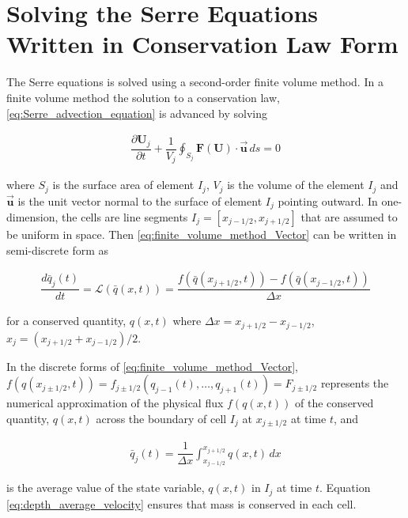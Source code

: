 \documentclass[SingleSpace,12pt]{Serre_ASCE}
\begin{document}
\section{Solving the Serre Equations Written in Conservation Law Form}
\label{section:Solving the Serre Equations Written in Conservation Law Form}

The Serre equations is solved using a second-order finite volume method. In a finite volume method the solution to a conservation law, \eqref{eq:Serre_advection_equation} is advanced by solving
\begin{linenomath*}
\begin{gather}
\dfrac{\partial \mathbf{U}_j}{\partial t} + \dfrac{1}{V_j} \oint_{S_j} \mathbf{F}(\mathbf{U}) \cdot \vec{\mathbf{u}} \, ds = 0
\label{eq:finite_volume_method_Vector}
\end{gather}
\end{linenomath*}
where $S_j$ is the surface area of element $I_j$, $V_j$ is the volume of the element $I_j$ and $\vec{\mathbf{u}}$ is the unit vector normal to the surface of element $I_j$ pointing outward. In one-dimension, the cells are line segments $I_j = [x_{j-1/2},x_{j+1/2}]$ that are assumed to be uniform in space. Then \eqref{eq:finite_volume_method_Vector} can be written in semi-discrete form as
\begin{linenomath*}
\begin{gather}\label{eq:semi-discrete}
\dfrac{d\bar{q}_j(t)}{dt} = \mathcal{L}(\bar{q}(x,t)) = \dfrac{f(\bar{q}(x_{j+1/2},t)) - f(\bar{q}(x_{j-1/2},t))}{\Delta x}
\end{gather}
\end{linenomath*}
for a conserved quantity, $q(x,t)$ where $\Delta x = x_{j+1/2} - x_{j-1/2}$, $x_j = (x_{j+1/2} + x_{j-1/2})/2$.

In the discrete forms of \eqref{eq:finite_volume_method_Vector}, $f(q(x_{j \pm 1/2},t)) = f_{j \pm 1/2}(q_{j-1}(t), \dots, q_{j+1}(t)) = F_{j \pm 1/2}$ represents the numerical approximation of the physical flux $f(q(x,t))$ of the conserved quantity, $q(x,t)$ across the boundary of cell $I_j$ at $x_{j \pm 1/2}$ at time $t$, and
\begin{linenomath*}
\begin{gather}\label{eq:depth_average_velocity}
\bar{q}_j(t) = \dfrac{1}{\Delta x} \int_{x_{j-1/2}}^{x_{j+1/2}} q(x,t) \, dx
\end{gather}
\end{linenomath*}
is the average value of the state variable, $q(x,t)$ in $I_j$ at time $t$. Equation \eqref{eq:depth_average_velocity} ensures that mass is conserved in each cell.
\end{document}
